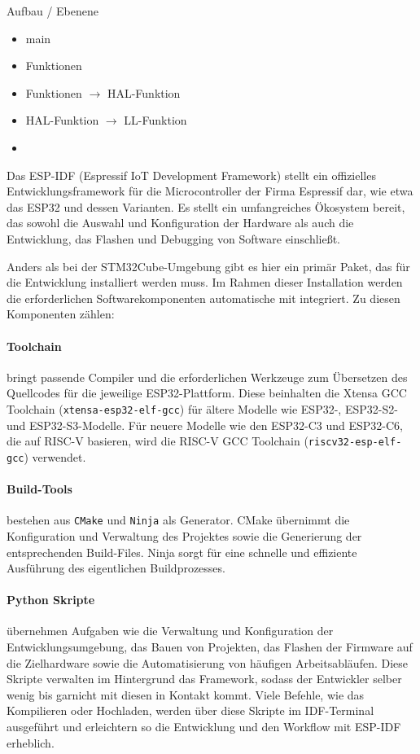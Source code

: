 Aufbau / Ebenene
\begin{itemize}
	\item main
	\item Funktionen
	\item Funktionen $\rightarrow$ HAL-Funktion
	\item HAL-Funktion $\rightarrow$ LL-Funktion
	\item 
\end{itemize}


Das ESP-IDF (Espressif IoT Development Framework) stellt ein offizielles Entwicklungsframework für die Microcontroller der Firma Espressif dar, wie etwa das ESP32 und dessen Varianten. 
Es stellt ein umfangreiches Ökosystem bereit, das sowohl die Auswahl und Konfiguration der Hardware als auch die Entwicklung, das Flashen und Debugging von Software einschließt.

Anders als bei der STM32Cube-Umgebung gibt es hier ein primär Paket, das für die Entwicklung installiert werden muss.
Im Rahmen dieser Installation werden die erforderlichen Softwarekomponenten automatische mit integriert.
Zu diesen Komponenten zählen:

\paragraph{Toolchain}
bringt passende Compiler und die erforderlichen Werkzeuge zum Übersetzen des Quellcodes für die jeweilige ESP32-Plattform. 
Diese beinhalten die Xtensa GCC Toolchain (\texttt{xtensa-esp32-elf-gcc}) für ältere Modelle wie  ESP32-, ESP32-S2- und ESP32-S3-Modelle.
Für neuere Modelle wie den ESP32-C3 und ESP32-C6, die auf RISC-V basieren, wird die RISC-V GCC Toolchain (\texttt{riscv32-esp-elf-gcc}) verwendet.

\paragraph{Build-Tools} 
bestehen aus \texttt{CMake} und \texttt{Ninja} als Generator. 
CMake übernimmt die Konfiguration und Verwaltung des Projektes sowie die Generierung der entsprechenden Build-Files. 
Ninja sorgt für eine schnelle und effiziente Ausführung des eigentlichen Buildprozesses.

\paragraph{Python Skripte}
übernehmen Aufgaben wie die Verwaltung und Konfiguration der Entwicklungsumgebung, das Bauen von Projekten, das Flashen der Firmware auf die Zielhardware sowie die Automatisierung von häufigen Arbeitsabläufen. 
Diese Skripte verwalten im Hintergrund das Framework, sodass der Entwickler selber wenig bis garnicht mit diesen in Kontakt kommt.
Viele Befehle, wie das Kompilieren oder Hochladen, werden über diese Skripte im IDF-Terminal ausgeführt und erleichtern so die Entwicklung und den Workflow mit ESP-IDF erheblich.

